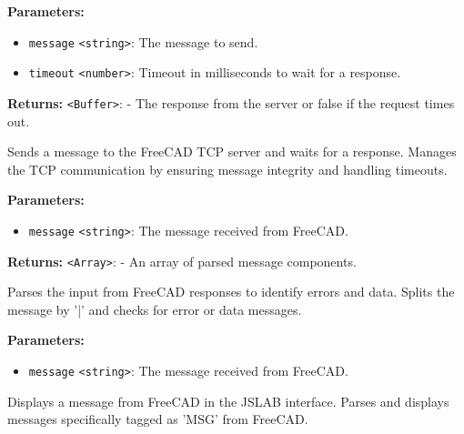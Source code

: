\documentclass[12pt,a4paper]{article}
\begin{document}
\noindent \textbf{Parameters:}
\begin{itemize}
  \item \texttt{message} \texttt{<string>}: The message to send.
  \item \texttt{timeout} \texttt{<number>}: Timeout in milliseconds to wait for a response.
\end{itemize}

\noindent \textbf{Returns:} \texttt{<Buffer>}: - The response from the server or false if the request times out.

\noindent Sends a message to the FreeCAD TCP server and waits for a response.
Manages the TCP communication by ensuring message integrity and handling timeouts.

\vspace{5mm}
\noindent {}


\noindent \textbf{Parameters:}
\begin{itemize}
  \item \texttt{message} \texttt{<string>}: The message received from FreeCAD.
\end{itemize}

\noindent \textbf{Returns:} \texttt{<Array>}: - An array of parsed message components.

\noindent Parses the input from FreeCAD responses to identify errors and data.
Splits the message by '|' and checks for error or data messages.

\vspace{5mm}
\noindent {}


\noindent \textbf{Parameters:}
\begin{itemize}
  \item \texttt{message} \texttt{<string>}: The message received from FreeCAD.
\end{itemize}

\noindent Displays a message from FreeCAD in the JSLAB interface.
Parses and displays messages specifically tagged as 'MSG' from FreeCAD.

\vspace{5mm}
\noindent {}
\end{document}
